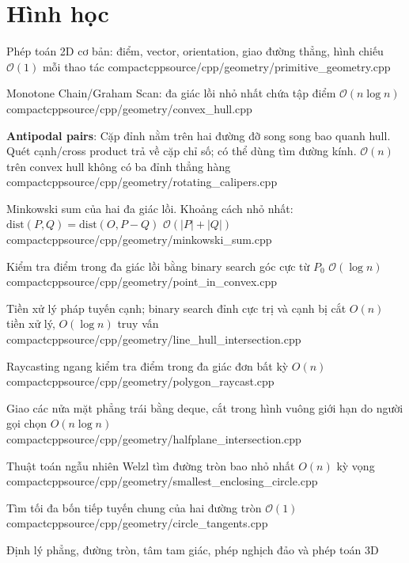\section{Hình học}

{Phép toán 2D cơ bản: điểm, vector, orientation, giao đường thẳng, hình chiếu}
{$\mathcal{O}(1)$ mỗi thao tác}
{compactcpp}{source/cpp/geometry/primitive_geometry.cpp}

{Monotone Chain/Graham Scan: đa giác lồi nhỏ nhất chứa tập điểm}
{$\mathcal{O}(n \log n)$}
{compactcpp}{source/cpp/geometry/convex_hull.cpp}

{\textbf{Antipodal pairs}: Cặp đỉnh nằm trên hai đường đỡ song song bao quanh hull. Quét cạnh/cross product trả về cặp chỉ số; có thể dùng tìm đường kính.}
{$\mathcal{O}(n)$ trên convex hull không có ba đỉnh thẳng hàng}
{compactcpp}{source/cpp/geometry/rotating_calipers.cpp}

{Minkowski sum của hai đa giác lồi. Khoảng cách nhỏ nhất: $\text{dist}(P, Q) = \text{dist}(O, P - Q)$}
{$\mathcal{O}(|P| + |Q|)$}
{compactcpp}{source/cpp/geometry/minkowski_sum.cpp}

{Kiểm tra điểm trong đa giác lồi bằng binary search góc cực từ $P_0$}
{$\mathcal{O}(\log n)$}
{compactcpp}{source/cpp/geometry/point_in_convex.cpp}

{Tiền xử lý pháp tuyến cạnh; binary search đỉnh cực trị và cạnh bị cắt}
{$O(n)$ tiền xử lý, $O(\log n)$ truy vấn}
{compactcpp}{source/cpp/geometry/line_hull_intersection.cpp}

{Raycasting ngang kiểm tra điểm trong đa giác đơn bất kỳ}
{$O(n)$}
{compactcpp}{source/cpp/geometry/polygon_raycast.cpp}

{Giao các nửa mặt phẳng trái bằng deque, cắt trong hình vuông giới hạn do người gọi chọn}
{$O(n \log n)$}
{compactcpp}{source/cpp/geometry/halfplane_intersection.cpp}

{Thuật toán ngẫu nhiên Welzl tìm đường tròn bao nhỏ nhất}
{$O(n)$ kỳ vọng}
{compactcpp}{source/cpp/geometry/smallest_enclosing_circle.cpp}

{Tìm tối đa bốn tiếp tuyến chung của hai đường tròn}
{$\mathcal{O}(1)$}
{compactcpp}{source/cpp/geometry/circle_tangents.cpp}

{Định lý phẳng, đường tròn, tâm tam giác, phép nghịch đảo và phép toán 3D}
{}
{}{}

